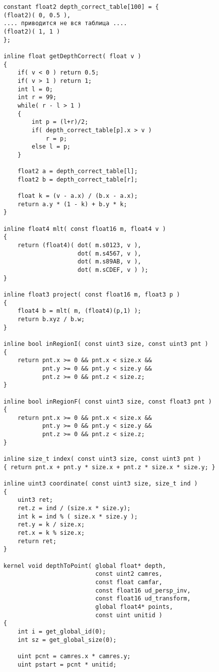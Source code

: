 \begin{verbatim}
constant float2 depth_correct_table[100] = {
(float2)( 0, 0.5 ),
.... приводится не вся таблица ....
(float2)( 1, 1 )
};

inline float getDepthCorrect( float v )
{
    if( v < 0 ) return 0.5;
    if( v > 1 ) return 1;
    int l = 0;
    int r = 99;
    while( r - l > 1 )
    {
        int p = (l+r)/2;
        if( depth_correct_table[p].x > v )
            r = p;
        else l = p;
    }

    float2 a = depth_correct_table[l];
    float2 b = depth_correct_table[r];

    float k = (v - a.x) / (b.x - a.x);
    return a.y * (1 - k) + b.y * k;
}

inline float4 mlt( const float16 m, float4 v )
{
    return (float4)( dot( m.s0123, v ),
                     dot( m.s4567, v ),
                     dot( m.s89AB, v ),
                     dot( m.sCDEF, v ) );
}

inline float3 project( const float16 m, float3 p )
{
    float4 b = mlt( m, (float4)(p,1) );
    return b.xyz / b.w;
}

inline bool inRegionI( const uint3 size, const uint3 pnt )
{
    return pnt.x >= 0 && pnt.x < size.x &&
           pnt.y >= 0 && pnt.y < size.y &&
           pnt.z >= 0 && pnt.z < size.z;
}

inline bool inRegionF( const uint3 size, const float3 pnt )
{
    return pnt.x >= 0 && pnt.x < size.x &&
           pnt.y >= 0 && pnt.y < size.y &&
           pnt.z >= 0 && pnt.z < size.z;
}

inline size_t index( const uint3 size, const uint3 pnt )
{ return pnt.x + pnt.y * size.x + pnt.z * size.x * size.y; }

inline uint3 coordinate( const uint3 size, size_t ind )
{
    uint3 ret;
    ret.z = ind / (size.x * size.y);
    int k = ind % ( size.x * size.y );
    ret.y = k / size.x;
    ret.x = k % size.x;
    return ret;
}

kernel void depthToPoint( global float* depth,
                          const uint2 camres,
                          const float camfar,
                          const float16 ud_persp_inv,
                          const float16 ud_transform,
                          global float4* points,
                          const uint unitid )
{
    int i = get_global_id(0);
    int sz = get_global_size(0);

    uint pcnt = camres.x * camres.y;
    uint pstart = pcnt * unitid;


\end{verbatim}
